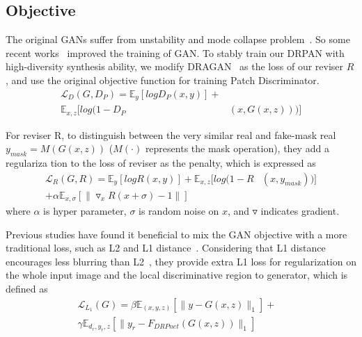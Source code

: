 \documentclass[10pt,twocolumn,letterpaper]{article}
\begin{document}
  \subsection{Objective}
  The original GANs suffer from unstability and mode collapse problem~\cite{Arjovsky2017Wasserstein,Arora2017Generalization}. So some recent works~\cite{Arjovsky2017Wasserstein,Qi2017Loss,Gulrajani2017Improved} improved the training of GAN. To stably train our DRPAN with high-diversity synthesis ability, we modify DRAGAN~\cite{Kodali2017How} as the loss of our reviser $R$, and use the original objective function for training Patch Discriminator.
  \begin{equation}
  \begin{aligned}
  \mathcal{L}_D(G,D_P) = \mathbb{E}_y[logD_P(x,y)]+\\\mathbb{E}_{x,z}[log(1-D_P&(x,G(x,z)))]
  \end{aligned}
  \end{equation}\par
  For reviser R, to distinguish between the very similar real and fake-mask real $y_{mask}=M(G(x,z))$ ($M (·)$ represents the mask operation), they add a regulariza tion to the loss of reviser as the penalty, which is expressed as
  \begin{equation}
  \begin{aligned}
  \mathcal{L}_R(G,R) = \mathbb{E}_y[logR(x,y)]+\mathbb{E}_{x,z}[log(1-R&(x,y_{mask}))]\\+\alpha\mathbb{E}_{x,\sigma}[\lVert\triangledown_xR(x+\sigma)-1\rVert]
  \end{aligned}
  \end{equation}
  where $\alpha$ is hyper parameter, $\sigma$ is random noise on $x$, and $\triangledown$ indicates gradient.\par
  Previous studies have found it beneficial to mix the GAN objective with a more traditional loss, such as L2 and L1 distance~\cite{Isola2016Image,Shrivastava2017Learning}. Considering that L1 distance encourages less blurring than L2~\cite{Isola2016Image}, they provide extra L1 loss for regularization on the whole input image and the local discriminative region to generator, which is defined as
  \begin{equation}
  \begin{aligned}
  \mathcal{L}_{L_1}(G) = \beta\mathbb{E}_(x,y,z)[\lVert y-G(x,z)\rVert_1]+&\\\gamma\mathbb{E}_{d_r,y_r,z}[\lVert y_r-F_{DRPnet}(G(x,z))\rVert_1]
  \end{aligned}
  \end{equation}
\end{document}

